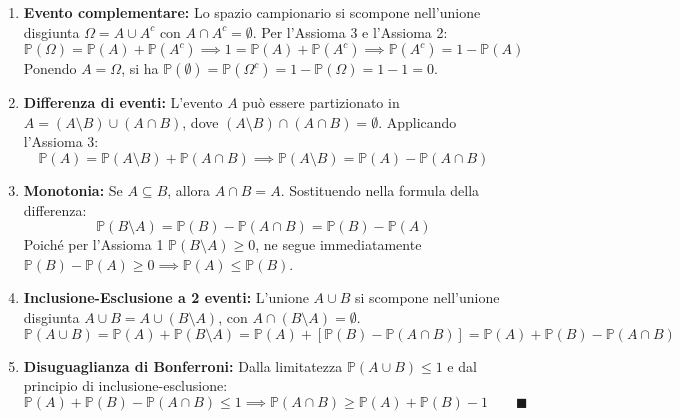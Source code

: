 \begin{dimostrazione}
\hfill
\begin{enumerate}
    \item \textbf{Evento complementare:} Lo spazio campionario si scompone nell'unione disgiunta $\Omega = A \cup A^c$ con $A \cap A^c = \emptyset$. Per l'Assioma 3 e l'Assioma 2:
    \begin{equation}
        \mathbb{P}(\Omega) = \mathbb{P}(A) + \mathbb{P}(A^c) \implies 1 = \mathbb{P}(A) + \mathbb{P}(A^c) \implies \mathbb{P}(A^c) = 1 - \mathbb{P}(A)
    \end{equation}
    Ponendo $A = \Omega$, si ha $\mathbb{P}(\emptyset) = \mathbb{P}(\Omega^c) = 1 - \mathbb{P}(\Omega) = 1 - 1 = 0$.

    \item \textbf{Differenza di eventi:} L'evento $A$ può essere partizionato in $A = (A \setminus B) \cup (A \cap B)$, dove $(A \setminus B) \cap (A \cap B) = \emptyset$. Applicando l'Assioma 3:
    \begin{equation}
        \mathbb{P}(A) = \mathbb{P}(A \setminus B) + \mathbb{P}(A \cap B) \implies \mathbb{P}(A \setminus B) = \mathbb{P}(A) - \mathbb{P}(A \cap B)
    \end{equation}

    \item \textbf{Monotonia:} Se $A \subseteq B$, allora $A \cap B = A$. Sostituendo nella formula della differenza:
    \begin{equation}
        \mathbb{P}(B \setminus A) = \mathbb{P}(B) - \mathbb{P}(A \cap B) = \mathbb{P}(B) - \mathbb{P}(A)
    \end{equation}
    Poiché per l'Assioma 1 $\mathbb{P}(B \setminus A) \ge 0$, ne segue immediatamente $\mathbb{P}(B) - \mathbb{P}(A) \ge 0 \implies \mathbb{P}(A) \le \mathbb{P}(B)$.

    \item \textbf{Inclusione-Esclusione a 2 eventi:} L'unione $A \cup B$ si scompone nell'unione disgiunta $A \cup B = A \cup (B \setminus A)$, con $A \cap (B \setminus A) = \emptyset$.
    \begin{equation}
        \mathbb{P}(A \cup B) = \mathbb{P}(A) + \mathbb{P}(B \setminus A) = \mathbb{P}(A) + \left[\mathbb{P}(B) - \mathbb{P}(A \cap B)\right] = \mathbb{P}(A) + \mathbb{P}(B) - \mathbb{P}(A \cap B)
    \end{equation}

    \item \textbf{Disuguaglianza di Bonferroni:} Dalla limitatezza $\mathbb{P}(A \cup B) \le 1$ e dal principio di inclusione-esclusione:
    \begin{equation}
        \mathbb{P}(A) + \mathbb{P}(B) - \mathbb{P}(A \cap B) \le 1 \implies \mathbb{P}(A \cap B) \ge \mathbb{P}(A) + \mathbb{P}(B) - 1 \qquad \blacksquare
    \end{equation}
\end{enumerate}
\end{dimostrazione}


